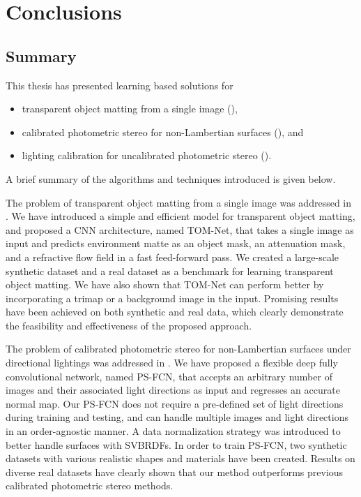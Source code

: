 
\chapter{Conclusions}
\label{ch:conclusion}

\section{Summary}
This thesis has presented learning based solutions for

\begin{itemize}
    \item transparent object matting from a single image (),
    \item calibrated photometric stereo for non-Lambertian surfaces (), and
    \item lighting calibration for uncalibrated photometric stereo ().
\end{itemize}

A brief summary of the algorithms and techniques introduced is given below.

The problem of transparent object matting from a single image was addressed in . We have introduced a simple and efficient model for transparent object matting, and proposed a CNN architecture, named TOM-Net, that takes a single image as input and predicts environment matte as an object mask, an attenuation mask, and a refractive flow field in a fast feed-forward pass. We created a large-scale synthetic dataset and a real dataset as a benchmark for learning transparent object matting. We have also shown that TOM-Net can perform better by incorporating a trimap or a background image in the input. Promising results have been achieved on both synthetic and real data, which clearly demonstrate the feasibility and effectiveness of the proposed approach.

The problem of calibrated photometric stereo for non-Lambertian surfaces under directional lightings was addressed in .
We have proposed a flexible deep fully convolutional network, named PS-FCN, that accepts an arbitrary number of images and their associated light directions as input and regresses an accurate normal map. 
Our PS-FCN does not require a pre-defined set of light directions during training and testing, and can handle multiple images and light directions in an order-agnostic manner.
A data normalization strategy was introduced to better handle surfaces with SVBRDFs. 
In order to train PS-FCN, two synthetic datasets with various realistic shapes and materials have been created. Results on diverse real datasets have clearly shown that our method outperforms previous calibrated photometric stereo methods. 

